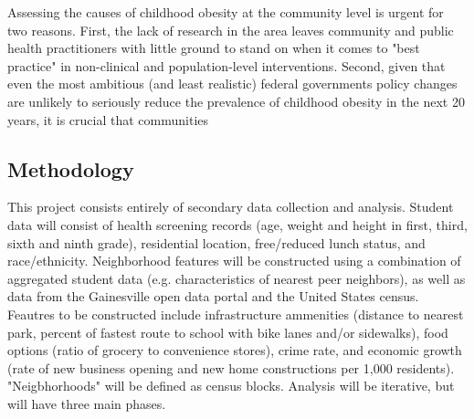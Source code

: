 \documentclass[11pt]{article}
\begin{document}
Assessing the causes of childhood obesity at the community level is urgent for two reasons.  First, the lack of research in the area leaves community and public health practitioners with little ground to stand on when it comes to "best practice" in non-clinical and population-level interventions.  Second, given that even the most ambitious (and least realistic) federal governments policy changes are unlikely to seriously reduce the prevalence of childhood obesity in the next 20 years\cite{Kristensen2014}, it is crucial that communities 

\subsection*{Methodology}
This project consists entirely of secondary data collection and analysis.  Student data will consist of health screening records (age, weight and height in first, third, sixth and ninth grade), residential location, free/reduced lunch status, and race/ethnicity.  Neighborhood features will be constructed using a combination of aggregated student data (e.g. characteristics of nearest peer neighbors), as well as data from the Gainesville open data portal and the United States census.  Feautres to be constructed include infrastructure ammenities (distance to nearest park, percent of fastest route to school with bike lanes and/or sidewalks), food options (ratio of grocery to convenience stores), crime rate, and economic growth (rate of new business opening and new home constructions per 1,000 residents).  "Neigbhorhoods" will be defined as census blocks. Analysis will be iterative, but will have three main phases.
\end{document}

